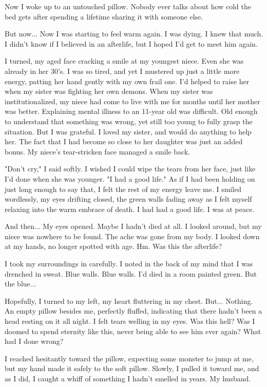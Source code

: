Now I woke up to an untouched pillow. Nobody ever talks about how cold the bed gets after spending a lifetime sharing it with someone else.

But now... Now I was starting to feel warm again. I was dying. I knew that much. I didn't know if I believed in an afterlife, but I hoped I'd get to meet him again.

I turned, my aged face cracking a smile at my youngest niece. Even she was already in her 30's. I was so tired, and yet I mustered up just a little more energy, patting her hand gently with my own frail one. I'd helped to raise her when my sister was fighting her own demons. When my sister was institutionalized, my niece had come to live with me for months until her mother was better. Explaining mental illness to an 11-year old was difficult. Old enough to understand that something was wrong, yet still too young to fully grasp the situation. But I was grateful. I loved my sister, and would do anything to help her. The fact that I had become so close to her daughter was just an added bonus. My niece's tear-stricken face managed a smile back.

"Don't cry," I said softly. I wished I could wipe the tears from her face, just like I'd done when she was younger. "I had a good life." As if I had been holding on just long enough to say that, I felt the rest of my energy leave me. I smiled wordlessly, my eyes drifting closed, the green walls fading away as I felt myself relaxing into the warm embrace of death. I had had a good life. I was at peace.

And then... My eyes opened. Maybe I hadn't died at all. I looked around, but my niece was nowhere to be found. The ache was gone from my body. I looked down at my hands, no longer spotted with age. Hm. Was this the afterlife?

I took my surroundings in carefully. I noted in the back of my mind that I was drenched in sweat. Blue walls. Blue walls. I'd died in a room painted green. But the blue...

Hopefully, I turned to my left, my heart fluttering in my chest. But... Nothing. An empty pillow besides me, perfectly fluffed, indicating that there hadn't been a head resting on it all night. I felt tears welling in my eyes. Was this hell? Was I doomed to spend eternity like this, never being able to see him ever again? What had I done wrong?

I reached hesitantly toward the pillow, expecting some monster to jump at me, but my hand made it safely to the soft pillow. Slowly, I pulled it toward me, and as I did, I caught a whiff of something I hadn't smelled in years. My husband.

